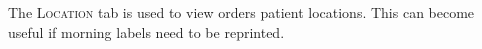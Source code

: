 The \textsc{Location} tab is used to view orders patient locations. This can become useful if morning labels need to be reprinted.

